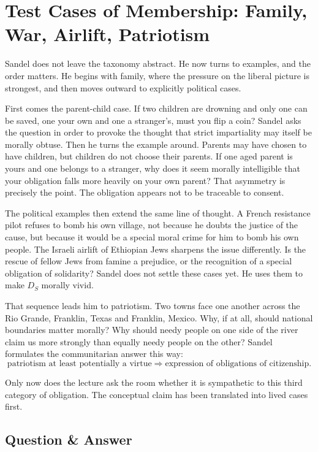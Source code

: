 \section{Test Cases of Membership: Family, War, Airlift, Patriotism}

Sandel does not leave the taxonomy abstract. He now turns to examples, and the order matters. He begins with family, where the pressure on the liberal picture is strongest, and then moves outward to explicitly political cases.

First comes the parent-child case. If two children are drowning and only one can be saved, one your own and one a stranger's, must you flip a coin? Sandel asks the question in order to provoke the thought that strict impartiality may itself be morally obtuse. Then he turns the example around. Parents may have chosen to have children, but children do not choose their parents. If one aged parent is yours and one belongs to a stranger, why does it seem morally intelligible that your obligation falls more heavily on your own parent? That asymmetry is precisely the point. The obligation appears not to be traceable to consent.

The political examples then extend the same line of thought. A French resistance pilot refuses to bomb his own village, not because he doubts the justice of the cause, but because it would be a special moral crime for him to bomb his own people. The Israeli airlift of Ethiopian Jews sharpens the issue differently. Is the rescue of fellow Jews from famine a prejudice, or the recognition of a special obligation of solidarity? Sandel does not settle these cases yet. He uses them to make \(D_S\) morally vivid.

That sequence leads him to patriotism. Two towns face one another across the Rio Grande, Franklin, Texas and Franklin, Mexico. Why, if at all, should national boundaries matter morally? Why should needy people on one side of the river claim us more strongly than equally needy people on the other? Sandel formulates the communitarian answer this way:
\begin{equation}
\text{patriotism at least potentially a virtue}
\Longrightarrow
\text{expression of obligations of citizenship}.
\end{equation}

Only now does the lecture ask the room whether it is sympathetic to this third category of obligation. The conceptual claim has been translated into lived cases first.

\subsection{Question \& Answer}

